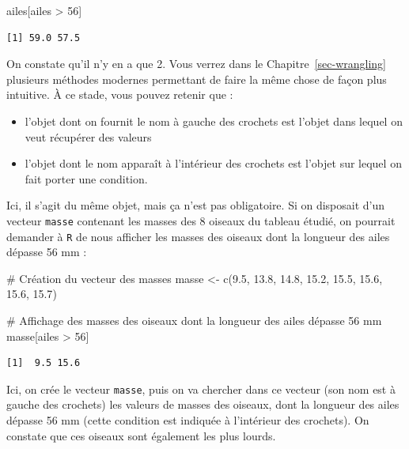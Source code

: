 \documentclass[
  a4paper,
  DIV=11,
  numbers=noendperiod,
  oneside]{scrreprt}
\newenvironment{Shaded}{}{}
\newcommand{\CommentTok}[1]{\textcolor[rgb]{0.42,0.45,0.49}{#1}}
\newcommand{\DecValTok}[1]{\textcolor[rgb]{0.00,0.36,0.77}{#1}}
\newcommand{\FloatTok}[1]{\textcolor[rgb]{0.00,0.36,0.77}{#1}}
\newcommand{\FunctionTok}[1]{\textcolor[rgb]{0.44,0.26,0.76}{#1}}
\newcommand{\NormalTok}[1]{\textcolor[rgb]{0.14,0.16,0.18}{#1}}
\newcommand{\OtherTok}[1]{\textcolor[rgb]{0.44,0.26,0.76}{#1}}
\newcommand{\SpecialCharTok}[1]{\textcolor[rgb]{0.00,0.36,0.77}{#1}}
\providecommand{\tightlist}{%
  \setlength{\itemsep}{0pt}\setlength{\parskip}{0pt}}\usepackage{longtable,booktabs,array}
\begin{document}
\begin{Shaded}
\begin{Highlighting}[]
\NormalTok{ailes[ailes }\SpecialCharTok{\textgreater{}} \DecValTok{56}\NormalTok{]}
\end{Highlighting}
\end{Shaded}

\begin{verbatim}
[1] 59.0 57.5
\end{verbatim}

On constate qu'il n'y en a que 2. Vous verrez dans le
Chapitre~\ref{sec-wrangling} plusieurs méthodes modernes permettant de
faire la même chose de façon plus intuitive. À ce stade, vous pouvez
retenir que :

\begin{itemize}
\tightlist
\item
  l'objet dont on fournit le nom à gauche des crochets est l'objet dans
  lequel on veut récupérer des valeurs
\item
  l'objet dont le nom apparaît à l'intérieur des crochets est l'objet
  sur lequel on fait porter une condition.
\end{itemize}

Ici, il s'agit du même objet, mais ça n'est pas obligatoire. Si on
disposait d'un vecteur \texttt{masse} contenant les masses des 8 oiseaux
du tableau étudié, on pourrait demander à \texttt{R} de nous afficher
les masses des oiseaux dont la longueur des ailes dépasse 56 mm :

\begin{Shaded}
\begin{Highlighting}[]
\CommentTok{\# Création du vecteur des masses}
\NormalTok{masse }\OtherTok{\textless{}{-}} \FunctionTok{c}\NormalTok{(}\FloatTok{9.5}\NormalTok{, }\FloatTok{13.8}\NormalTok{, }\FloatTok{14.8}\NormalTok{, }\FloatTok{15.2}\NormalTok{, }\FloatTok{15.5}\NormalTok{, }\FloatTok{15.6}\NormalTok{, }\FloatTok{15.6}\NormalTok{, }\FloatTok{15.7}\NormalTok{)}

\CommentTok{\# Affichage des masses des oiseaux dont la longueur des ailes dépasse 56 mm}
\NormalTok{masse[ailes }\SpecialCharTok{\textgreater{}} \DecValTok{56}\NormalTok{]}
\end{Highlighting}
\end{Shaded}

\begin{verbatim}
[1]  9.5 15.6
\end{verbatim}

Ici, on crée le vecteur \texttt{masse}, puis on va chercher dans ce
vecteur (son nom est à gauche des crochets) les valeurs de masses des
oiseaux, dont la longueur des ailes dépasse 56 mm (cette condition est
indiquée à l'intérieur des crochets). On constate que ces oiseaux sont
également les plus lourds.
\end{document}
